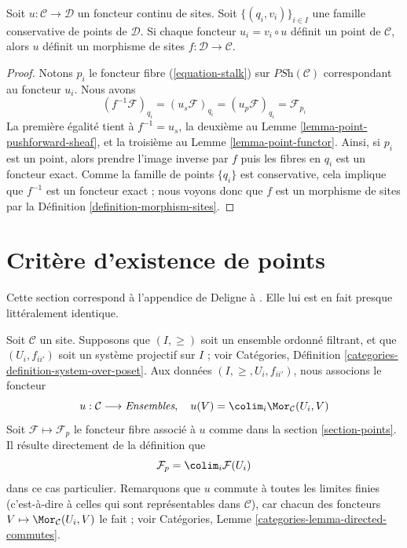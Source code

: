 \begin{lemma}
\label{lemma-check-morphism-sites}
Soit $u : \mathcal{C} \to \mathcal{D}$ un foncteur continu de sites.
Soit $\{(q_i, v_i)\}_{i\in I}$ une famille conservative de points de
$\mathcal{D}$. Si chaque foncteur $u_i = v_i \circ u$ définit
un point de $\mathcal{C}$,
alors $u$ définit un morphisme de sites $f : \mathcal{D} \to \mathcal{C}$.
\end{lemma}

\begin{proof}
Notons $p_i$ le foncteur fibre (\ref{equation-stalk}) sur
$\textit{PSh}(\mathcal{C})$ correspondant au foncteur $u_i$. Nous avons
$$
(f^{-1}\mathcal{F})_{q_i} =
(u_s\mathcal{F})_{q_i} =
(u_p\mathcal{F})_{q_i} =
\mathcal{F}_{p_i}
$$
La première égalité tient à $f^{-1} = u_s$, la deuxième au
Lemme \ref{lemma-point-pushforward-sheaf}, et la troisième
au Lemme \ref{lemma-point-functor}.
Ainsi, si $p_i$ est un point, alors prendre l’image inverse par $f$
puis les fibres en $q_i$ est un foncteur exact.
Comme la famille de points $\{q_i\}$ est conservative, cela
implique que $f^{-1}$ est un foncteur exact ; nous voyons donc
que $f$ est un morphisme de sites par la Définition \ref{definition-morphism-sites}.
\end{proof}





\section{Critère d’existence de points}
\label{section-criterion-points}

\noindent
Cette section correspond à l’appendice de Deligne à \cite[Expos\'e VI]{SGA4}.
Elle lui est en fait presque littéralement identique.

\medskip\noindent
Soit $\mathcal{C}$ un site.
Supposons que $(I, \geq)$ soit un ensemble ordonné filtrant,
et que $(U_i, f_{ii'})$ soit un système projectif sur $I$ ; voir
Catégories, Définition \ref{categories-definition-system-over-poset}.
Aux données $(I, \geq, U_i, f_{ii'})$, nous associons le foncteur
$$
u : \mathcal{C} \longrightarrow \textit{Ensembles}, \quad
u(V) = \colim_i \Mor_\mathcal{C}(U_i , V)
$$
Soit $\mathcal{F} \mapsto \mathcal{F}_p$ le foncteur fibre
associé à $u$ comme dans la section \ref{section-points}.
Il résulte directement de la définition que
$$
\mathcal{F}_p = \colim_i \mathcal{F}(U_i)
$$
dans ce cas particulier.
Remarquons que $u$ commute à toutes les limites finies (c’est-à-dire à celles qui
sont représentables dans $\mathcal{C}$), car chacun des foncteurs
$V \mapsto \Mor_\mathcal{C}(U_i , V)$ le fait ; voir
Catégories, Lemme \ref{categories-lemma-directed-commutes}.

